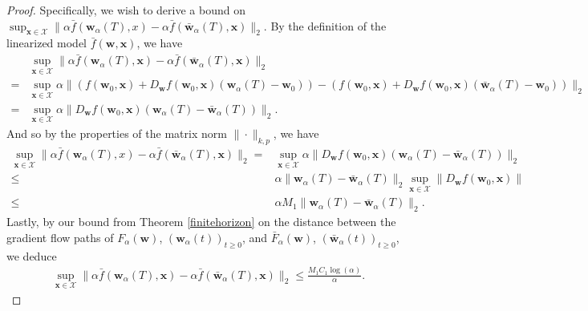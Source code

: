 \documentclass{article}
\begin{document}
\begin{proof}
Specifically, we wish to derive a bound on $\sup_{\boldsymbol{x} \in \mathcal{X}}\| \alpha \bar{f}(\boldsymbol{w}_{\alpha}(T), x) - \alpha \bar{f}(\boldsymbol{\bar{w}}_{\alpha}(T), \boldsymbol{x}) \|_2$. By the definition of the linearized model $\bar{f}(\boldsymbol{w}, \boldsymbol{x})$, we have 
\begin{align*}
    &\sup_{\boldsymbol{x} \in \mathcal{X}}\| \alpha \bar{f}(\boldsymbol{w}_{\alpha}(T), \boldsymbol{x}) - \alpha \bar{f}(\boldsymbol{\bar{w}}_{\alpha}(T), \boldsymbol{x}) \|_2\\
    =& \sup_{\boldsymbol{x} \in \mathcal{X}} \alpha\| (f(\boldsymbol{w}_0, \boldsymbol{x}) + D_{\boldsymbol{w}}f(\boldsymbol{w}_0, \boldsymbol{x})(\boldsymbol{w}_{\alpha}(T) - \boldsymbol{w}_0)) - (f(\boldsymbol{w}_0, \boldsymbol{x}) + D_{\boldsymbol{w}}f(\boldsymbol{w}_0, \boldsymbol{x})(\boldsymbol{\bar{w}}_{\alpha}(T) - \boldsymbol{w}_0)) \|_2\\
    =& \sup_{\boldsymbol{x} \in \mathcal{X}} \alpha \|D_{\boldsymbol{w}}f(\boldsymbol{w}_0, \boldsymbol{x})(\boldsymbol{w}_{\alpha}(T) -  \boldsymbol{\bar{w}}_{\alpha}(T)) \|_2.
\end{align*}
And so by the properties of the matrix norm $\| \cdot \|_{k, p}$, we have
\begin{align*}
    \sup_{\boldsymbol{x} \in \mathcal{X}}\| \alpha \bar{f}(\boldsymbol{w}_{\alpha}(T), x) - \alpha \bar{f}(\boldsymbol{\bar{w}}_{\alpha}(T), \boldsymbol{x}) \|_2 =& \sup_{\boldsymbol{x} \in \mathcal{X}} \alpha \|D_{\boldsymbol{w}}f(\boldsymbol{w}_0, \boldsymbol{x})(\boldsymbol{w}_{\alpha}(T) -  \boldsymbol{\bar{w}}_{\alpha}(T)) \|_2\\
    \leq& \alpha \|\boldsymbol{w}_{\alpha}(T) -  \boldsymbol{\bar{w}}_{\alpha}(T) \|_2 \sup_{\boldsymbol{x} \in \mathcal{X}} \|D_{\boldsymbol{w}}f(\boldsymbol{w}_0, \boldsymbol{x})\|\\
    \leq& \alpha M_1\|\boldsymbol{w}_{\alpha}(T) -  \boldsymbol{\bar{w}}_{\alpha}(T) \|_2.
\end{align*}
Lastly, by our bound from Theorem \ref{finitehorizon} on the distance between the gradient flow paths of $F_{\alpha}(\boldsymbol{w})$, $(\boldsymbol{w}_{\alpha}(t))_{t \geq 0}$, and $\bar{F}_{\alpha}(\boldsymbol{w})$, $(\boldsymbol{\bar{w}}_{\alpha}(t))_{t \geq 0}$, we deduce
\begin{align*}
     \sup_{\boldsymbol{x} \in \mathcal{X}}\| \alpha \bar{f}(\boldsymbol{w}_{\alpha}(T), \boldsymbol{x}) - \alpha \bar{f}(\boldsymbol{\bar{w}}_{\alpha}(T), \boldsymbol{x}) \|_2 \leq \frac{M_1C_1 \log(\alpha)}{\alpha} .
\end{align*}


\end{proof}
\end{document}
